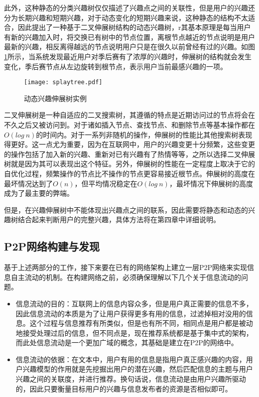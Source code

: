 此外，这种静态的分类兴趣树仅仅描述了兴趣点之间的关联性，但是用户的兴趣还分为长期兴趣和短期兴趣，对于动态变化的短期兴趣来说，这种静态的结构不太适合，因此提出了一种基于二叉伸展树结构的动态兴趣树，r其基本原理是每当用户有新的兴趣加入时，将交换已有树中的节点位置，离根节点越近的节点说明是用户最新的兴趣，相反离得越远的节点说明用户只是在很久以前曾经有过的兴趣。如图\ref{fig:splaytree}所示，当系统发现最近用户对季后赛有了浓厚的兴趣时，伸展树的结构就会发生变化，季后赛节点从左边旋转到根节点，表示用户当前最感兴趣的一项。

\begin{figure}
\centering
\texttt{[image: splaytree.pdf]}
\caption{动态兴趣伸展树实例}
\label{fig:splaytree}
\end{figure}

二叉伸展树是一种自适应的二叉搜索树，其遵循的特点是近期访问过的节点将会在不久之后又被访问到。对于诸如插入节点、查找节点、和删除节点等基本操作都在$O(log~n)$的时间内。对于一系列非随机的操作，伸展树的性能比其他搜索树表现得更好。这一点尤为重要，因为在互联网中，用户的兴趣变更十分频繁，这些变更的操作包括了加入新的兴趣、重新对已有兴趣有了热情等等，之所以选择二叉伸展树就是因为其可以表现出这个特征。另外，伸展树的性能在一定程度上取决于它的自优化过程，频繁操作的节点比不操作的节点更容易接近根节点。伸展树的高度在最坏情况达到了$O(n)$，但平均情况稳定在$O(log~n)$，最坏情况下伸展树的高度成为了最主要的弊端。

但是，在兴趣伸展树中不能体现出兴趣点之间的联系，因此需要将静态和动态的兴趣树结合起来判断用户的完整兴趣，具体方法将在第四章中详细说明。

\subsection{P2P网络构建与发现}
基于上述两部分的工作，接下来要在已有的网络架构上建立一层P2P网络来实现信息自主流动的机制。在构建网络之前，必须确保理解以下几个关于信息流动的问题。
\begin{itemize}
  \item 信息流动的目的：互联网上的信息内容众多，但是用户真正需要的信息不多，因此信息流动的本质是为了让用户获得更多有用的信息，过滤掉相对没用的信息。这个过程与信息推荐有所类似，但是也有所不同，相同点是用户都是被动地接受处理过后的信息，但不同点是，现在推荐系统都是基于集中式的架构，而此处信息流动是一个更加广域的概念，其基础是建立在P2P的网络中。
  \item 信息流动的依据：在文本中，用户有用的信息是指用户真正感兴趣的内容，用户兴趣模型的作用就是先挖掘出用户的潜在兴趣，然后匹配信息的主题与用户兴趣之间的关联度，并进行推荐。换句话说，信息流动是由用户兴趣所驱动的，因此只要衡量目标用户的兴趣与信息发布者的资源是否相似即可。
\end{itemize}

